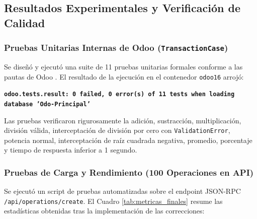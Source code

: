\documentclass{article}
\begin{document}
\subsection{Resultados Experimentales y Verificación de Calidad}

\subsubsection{Pruebas Unitarias Internas de Odoo (\texttt{TransactionCase})}
Se diseñó y ejecutó una suite de 11 pruebas unitarias formales conforme a las pautas de Odoo \cite{odoo_dev, ieee829}. El resultado de la ejecución en el contenedor \texttt{odoo16} arrojó:
\begin{center}
\textbf{\texttt{odoo.tests.result: 0 failed, 0 error(s) of 11 tests when loading database 'Odo-Principal'}}
\end{center}
Las pruebas verificaron rigurosamente la adición, sustracción, multiplicación, división válida, interceptación de división por cero con \texttt{ValidationError}, potencia normal, interceptación de raíz cuadrada negativa, promedio, porcentaje y tiempo de respuesta inferior a 1 segundo.

\subsubsection{Pruebas de Carga y Rendimiento (100 Operaciones en API)}
Se ejecutó un script de pruebas automatizadas sobre el endpoint JSON-RPC \texttt{/api/operations/create}. El Cuadro \ref{tab:metricas_finales} resume las estadísticas obtenidas tras la implementación de las correcciones:

\begin{table}[H]
\centering
\caption{Estadísticas finales de la suite de 100 pruebas automatizadas post-refactorización.}
\label{tab:metricas_finales}
\renewcommand{\arraystretch}{1.2}
\end{table}
\end{document}
